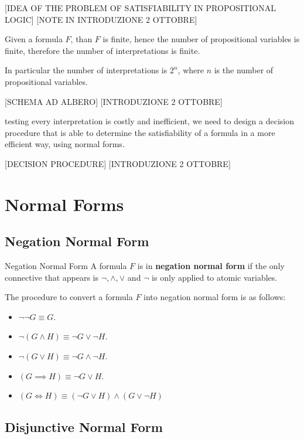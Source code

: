 [IDEA OF THE PROBLEM OF SATISFIABILITY IN PROPOSITIONAL LOGIC]
[NOTE IN INTRODUZIONE 2 OTTOBRE]

Given a formula $F$, than $F$ is finite, hence the number of propositional
variables is finite, therefore the number of interpretations is finite.

In particular the number of interpretations is $2^{n}$, where $n$
is the number of propositional variables.

[SCHEMA AD ALBERO] [INTRODUZIONE 2 OTTOBRE]

testing every interpretation is costly and inefficient,
we need to design a decision procedure that is able to determine the satisfiability
of a formula in a more efficient way, using normal forms.

[DECISION PROCEDURE] [INTRODUZIONE 2 OTTOBRE]

\section{Normal Forms}
\label{subsec:Normal Forms}

\subsection{Negation Normal Form}
\label{subsec:Negation Normal Form}

\begin{definition}{Negation Normal Form}
    A formula $F$ is in \textbf{negation normal form} if
    the only connective that appears is $\neg, \land, \lor$ and 
    $\neg$ is only applied to atomic variables. 
\end{definition}

The procedure to convert a formula $F$ into negation normal form is as follows:
\begin{itemize}
    \item $\neg \neg G \equiv G$.
    \item $\neg (G \land H) \equiv \neg G \lor \neg H$.
    \item $\neg (G \lor H) \equiv \neg G \land \neg H$.
    \item $(G \implies H) \equiv \neg G \lor H$.
    \item $(G \iff H) \equiv (\neg G \lor H) \land (G \lor \neg H)$
\end{itemize}

\subsection{Disjunctive Normal Form}
\label{subsec:Disjunctive Normal Form}

